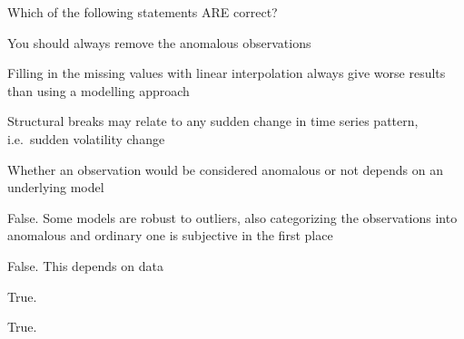 
\begin{question}
Which of the following statements ARE correct?
\begin{answerlist}
  \item You should always remove the anomalous observations
  \item Filling in the missing values with linear interpolation always give worse results than using a modelling approach
  \item Structural breaks may relate to any sudden change in time series pattern, i.e.~sudden volatility change
  \item Whether an observation would be considered anomalous or not depends on an underlying model
\end{answerlist}
\end{question}

\begin{solution}
\begin{answerlist}
  \item False. Some models are robust to outliers, also categorizing the observations into anomalous and ordinary one is subjective in the first place
  \item False. This depends on data
  \item True.
  \item True.
\end{answerlist}
\end{solution}

